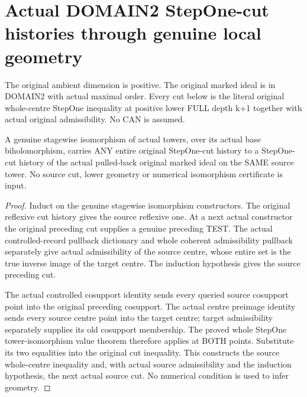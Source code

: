 \section{Actual DOMAIN2 StepOne-cut histories through genuine local geometry}

The original ambient dimension is positive. The original marked ideal
is in DOMAIN2 with actual maximal order. Every cut below is the literal
original whole-centre StepOne inequality at positive lower FULL depth
k+1 together with actual original admissibility. No CAN is assumed.

\begin{theorem}
\label{hir:original-bound-two-stepone-cut-tower-iso}
\leanok
A genuine stagewise isomorphism of actual towers, over its actual base
biholomorphism, carries ANY entire original StepOne-cut history to a
StepOne-cut history of the actual pulled-back original marked ideal on
the SAME source tower. No source cut, lower geometry or numerical
isomorphism certificate is input.
\end{theorem}
\begin{proof}
Induct on the genuine stagewise isomorphism constructors. The original
reflexive cut history gives the source reflexive one. At a next actual
constructor the original preceding cut supplies a genuine preceding TEST.
The actual controlled-record pullback dictionary and whole coherent
admissibility pullback separately give actual admissibility of the source
centre, whose entire set is the true inverse image of the target centre.
The induction hypothesis gives the source preceding cut.

The actual controlled cosupport identity sends every queried source
cosupport point into the original preceding cosupport. The actual centre
preimage identity sends every source centre point into the target centre;
target admissibility separately supplies its old cosupport membership.
The proved whole StepOne tower-isomorphism value theorem therefore applies
at BOTH points. Substitute its two equalities into the original cut
inequality. This constructs the source whole-centre inequality and,
with actual source admissibility and the induction hypothesis, the next
actual source cut. No numerical condition is used to infer geometry.
\end{proof}

